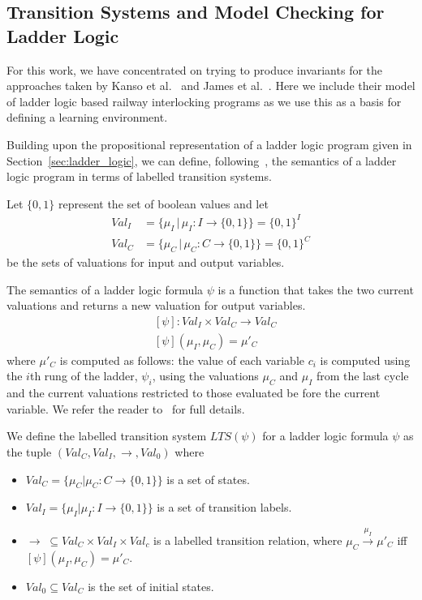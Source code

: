 \documentclass[runningheads]{llncs}
\begin{document}
\subsection{Transition Systems and Model Checking for Ladder Logic}
For this work, we have concentrated on trying to produce invariants for the approaches taken by Kanso et al.~\cite{kanso2009automated} and James et al.~\cite{james2013verification}. Here we include their model of ladder logic based railway interlocking programs as we use this as a basis for defining a learning environment.

Building upon the propositional representation of a ladder logic program given in Section~\ref{sec:ladder_logic}, we can define, following~\cite{james2013verification}, the semantics of a ladder logic program in terms of labelled transition systems.

Let $\{0,1\}$ represent the set of boolean values and let
\begin{align*}
	Val_I  &= \{ \mu_I \, | \, \mu_I : I \to \{0 , 1 \} \}  = \{0,1 \}^I   \\
	Val_C &=  \{ \mu_C \, | \, \mu_C : C \to \{ 0 , 1 \} \} = \{ 0,1 \}^C 
\end{align*}
be the sets of valuations for input and output variables.

The semantics of a ladder logic formula $\psi$ is a function that takes the two current valuations and returns a new
valuation for output variables.
\begin{align*}
	& [ \psi ] : Val_I \times Val_C \to  Val_C \\
	& [ \psi ] ( \mu_I, \mu_C ) = \mu'_C 
\end{align*}
where $\mu'_C$ is computed as follows: the value of each variable $c_i$ is computed using the $i$th rung of the ladder, $\psi_i$, using the valuations $\mu_C$ and $\mu_I$ from the last cycle and the current valuations restricted to those evaluated be fore the current variable. We refer the reader to~\cite{james2013verification} for full details.

\begin{definition}
	We define the labelled transition system $LTS(\psi)$ for a ladder logic formula $\psi$ as the tuple $(Val_C,Val_I,\rightarrow, Val_0)$ where
\end{definition}
\begin{itemize}
	\item $Val_C = \{ \mu_C | \mu_C : C \to \{ 0 , 1 \} \}$ is a set of states.
	\item $Val_I = \{ \mu_I | \mu_I : I \to \{0 , 1 \} \}$ is a set of transition labels.
	\item $\rightarrow \; \subseteq Val_C \times Val_I \times Val_c $ is a labelled transition relation, where $\mu_C \xrightarrow{\mu_I} \mu'_C$ iff  $[ \psi ] ( \mu_I , \mu_C) = \mu'_C$.
	\item $ Val_0 \subseteq Val_C$ is the set of initial states.
\end{itemize}
\end{document}
